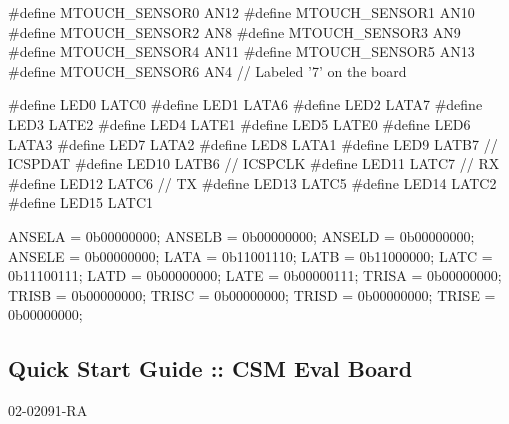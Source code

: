 \begin{DoxyCode}
\textcolor{preprocessor}{#define MTOUCH\_SENSOR0              AN12         }
\textcolor{preprocessor}{#define MTOUCH\_SENSOR1              AN10         }
\textcolor{preprocessor}{#define MTOUCH\_SENSOR2              AN8    }
\textcolor{preprocessor}{#define MTOUCH\_SENSOR3              AN9  }
\textcolor{preprocessor}{#define MTOUCH\_SENSOR4              AN11}
\textcolor{preprocessor}{#define MTOUCH\_SENSOR5              AN13}
\textcolor{preprocessor}{#define MTOUCH\_SENSOR6              AN4     // Labeled '7' on the board}

\textcolor{preprocessor}{#define LED0  LATC0}
\textcolor{preprocessor}{#define LED1  LATA6}
\textcolor{preprocessor}{#define LED2  LATA7}
\textcolor{preprocessor}{#define LED3  LATE2}
\textcolor{preprocessor}{#define LED4  LATE1}
\textcolor{preprocessor}{#define LED5  LATE0}
\textcolor{preprocessor}{#define LED6  LATA3}
\textcolor{preprocessor}{#define LED7  LATA2}
\textcolor{preprocessor}{#define LED8  LATA1}
\textcolor{preprocessor}{#define LED9  LATB7     // ICSPDAT}
\textcolor{preprocessor}{#define LED10 LATB6     // ICSPCLK}
\textcolor{preprocessor}{#define LED11 LATC7     // RX}
\textcolor{preprocessor}{#define LED12 LATC6     // TX}
\textcolor{preprocessor}{#define LED13 LATC5}
\textcolor{preprocessor}{#define LED14 LATC2}
\textcolor{preprocessor}{#define LED15 LATC1}

ANSELA  = 0b00000000;
ANSELB  = 0b00000000;
ANSELD  = 0b00000000;
ANSELE  = 0b00000000;
LATA    = 0b11001110;
LATB    = 0b11000000;
LATC    = 0b11100111;
LATD    = 0b00000000;
LATE    = 0b00000111;
TRISA   = 0b00000000;
TRISB   = 0b00000000;
TRISC   = 0b00000000;
TRISD   = 0b00000000;
TRISE   = 0b00000000;
\end{DoxyCode}
 \hypertarget{GSE_RA}{}\subsection{Quick Start Guide \+:\+: C\+S\+M Eval Board}\label{GSE_RA}
\begin{DoxyItemize}
\item 02-\/02091-\/\+R\+A\end{DoxyItemize}

